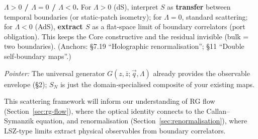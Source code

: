 \textbf{$\Lambda>0$ / $\Lambda=0$ / $\Lambda<0$.} For $\Lambda>0$ (dS), interpret $S$ as \textbf{transfer} between temporal boundaries (or static‑patch isometry); for $\Lambda=0$, standard scattering; for $\Lambda<0$ (AdS), \textbf{extract $S$} as a flat‑space limit of boundary correlators (port obligation). This keeps the Core constructive and the residual invisible (bulk = two boundaries). (Anchors: §7.19 ``Holographic renormalisation''; §11 ``Double self‑boundary maps''.)

\textit{Pointer:} The universal generator $G(z,\bar z;\vec q,\Lambda)$ already provides the observable envelope (§2); $S_N$ is just the domain‑specialised composite of your existing maps.

This scattering framework will inform our understanding of RG flow (Section~\ref{sec:rg-flow}), where the optical identity connects to the Callan–Symanzik equation, and renormalisation (Section~\ref{sec:renormalisation}), where LSZ-type limits extract physical observables from boundary correlators.